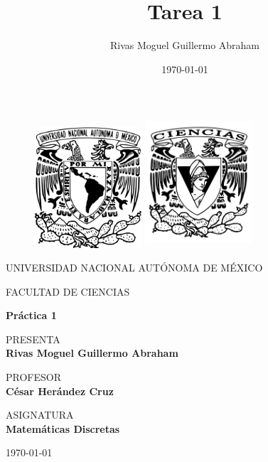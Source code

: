 \documentclass[11pt]{article}
\title{Tarea 1}
\author{Rivas Moguel Guillermo Abraham}
\date{\today}
\begin{document}
\thispagestyle{empty}
\begin{figure}[ht]
  \includegraphics[width=4cm]{logo_unam.png}
  \label{EscudoUNAM}
  \endminipage
  \includegraphics[height = 4.9cm ,width=4cm]{logo_ciencias.png}
  \label{EscudoFC}
  \endminipage
\end{figure}

\begin{center}
  \vspace{0.8cm}
  \LARGE
  UNIVERSIDAD NACIONAL AUTÓNOMA DE MÉXICO

  \vspace{0.8cm}
  \LARGE
  FACULTAD DE CIENCIAS

  \vspace{1.7cm}
  \Large
  \textbf{Práctica 1}

  \vspace{1.3cm}
  \normalsize
  PRESENTA \\
  \vspace{.3cm}
  \large
  \textbf{Rivas Moguel Guillermo Abraham}

  \vspace{1.3cm}
  \normalsize
  PROFESOR \\
  \vspace{.3cm}
  \large
  \textbf{César Herández Cruz}

  \vspace{1.3cm}
  \normalsize
  ASIGNATURA \\
  \vspace{.3cm}
  \large
  \textbf{Matemáticas Discretas}

  \vspace{1.3cm}
  \today
\end{center}


\newpage
\end{document}

